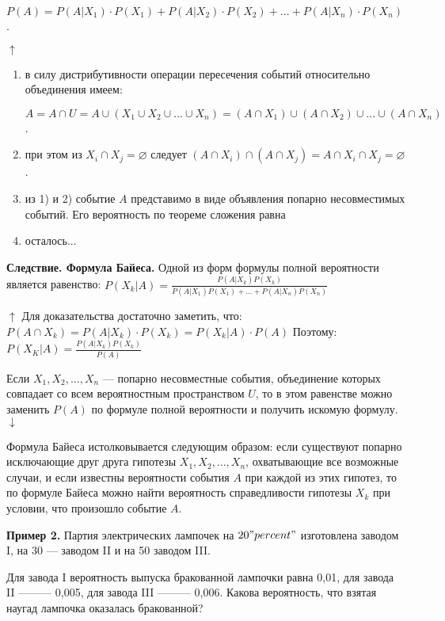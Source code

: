 \documentclass{article}
\begin{document}
\(P(A) = P(A|X_1) \cdot P(X_1) + P(A|X_2) \cdot P(X_2) + ... + P(A|X_n) \cdot P(X_n)\).

\(\uparrow\)
\begin{enumerate}
    \item в силу дистрибутивности операции пересечения событий относительно объединения имеем:
    
    \(A = A \cap U = A \cup (X_1 \cup X_2 \cup ... \cup X_n) = (A \cap X_1) \cup (A \cap X_2) \cup ... \cup (A \cap X_n)\).

    \item при этом из \(X_i \cap X_j = \varnothing\) следует \( (A \cap X_i) \cap (A \cap X_j) = A \cap X_i \cap X_j = \varnothing\).
    \item из 1) и 2) событие $A$ представимо в виде объявления попарно несовместимых событий. Его вероятность по теореме сложения равна %
    \item осталось... %
\end{enumerate}



\textbf{Следствие. Формула Байеса.} Одной из форм формулы полной вероятности является равенство: \( P(X_k|A) = \frac{P(A|X_k )P(X_k)}{P(A|X_1)P(X_1)+...+ P(A|X_n)P(X_n)} \)

\(\uparrow\) Для доказательства достаточно заметить, что: \(P(A \cap X_k)=P(A|X_k) \cdot P(X_k) = P(X_k|A) \cdot P(A)\)
Поэтому: \( P(X_K | A) =  \frac{P(A|X_k)P(X_k)}{P(A)}\)

Если \(X_1, X_2,..., X_n\) — попарно несовместные события, объединение которых совпадает со всем вероятностным пространством $U$, то в этом равенстве можно заменить $P(A)$ по формуле полной вероятности и получить искомую формулу. $\downarrow$

Формула Байеса истолковывается следующим образом: если существуют попарно исключающие друг друга гипотезы \(X_1, X_2,..., X_n\), охватывающие все возможные случаи, и если известны вероятности события $A$ при каждой из этих гипотез, то по формуле Байеса можно найти вероятность справедливости гипотезы $X_k$ при условии, что произошло событие $A$.


\textbf{Пример 2.} Партия электрических лампочек на \(20 "percent"\) изготовлена заводом I, на 30 — заводом II и на 50 заводом III.

Для завода I вероятность выпуска бракованной лампочки равна 0,01, для завода II ——— 0,005, для завода III ——— 0,006. Какова вероятность, что взятая наугад лампочка оказалась бракованной?
\end{document}
